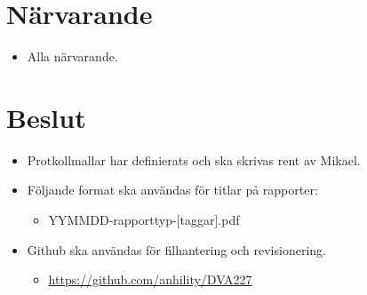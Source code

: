 \section*{Närvarande}
\begin{itemize}
    \itemsep0em
    \item Alla närvarande.
\end{itemize}










\section*{Beslut}
\begin{itemize}
    \itemsep0em
    \item Protkollmallar har definierats och ska skrivas rent av Mikael.
    \item Följande format ska användas för titlar på rapporter:
    \begin{itemize}
        \itemsep0em
        \item YYMMDD-rapporttyp-[taggar].pdf
    \end{itemize}
    \item Github ska användas för filhantering och revisionering.
    \begin{itemize}
        \itemsep0em
        \item \url{https://github.com/anhility/DVA227}
    \end{itemize}
\end{itemize}

